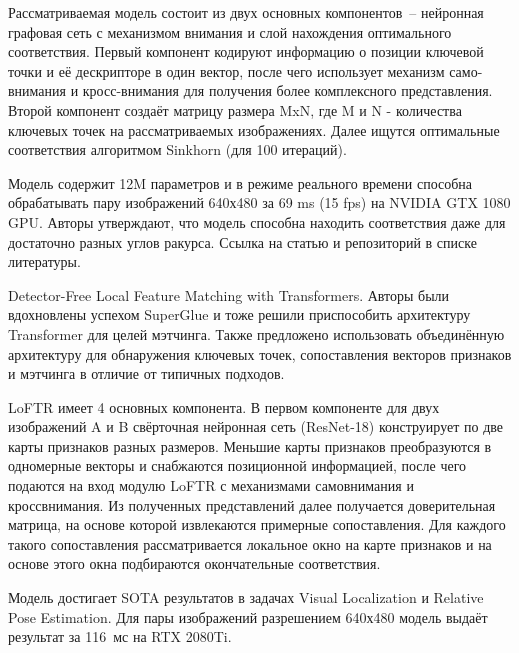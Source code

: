 \documentclass[a4paper]{article}
\begin{document}


Рассматриваемая модель состоит из двух основных компонентов~-- нейронная графовая сеть с механизмом внимания и слой нахождения оптимального соответствия. Первый компонент кодируют информацию о позиции ключевой точки и её дескрипторе в один вектор, после чего использует механизм само-внимания и кросс-внимания для получения более комплексного представления. Второй компонент создаёт матрицу размера MxN, где M и N - количества ключевых точек на рассматриваемых изображениях. Далее ищутся оптимальные соответствия алгоритмом Sinkhorn (для 100 итераций).


Модель содержит 12M параметров и в режиме реального времени способна обрабатывать пару изображений 640х480 за 69 ms (15 fps) на NVIDIA GTX 1080 GPU. Авторы утверждают, что модель способна находить соответствия даже для достаточно разных углов ракурса. Ссылка на статью и репозиторий в списке литературы.


 Detector-Free Local Feature Matching with Trans\-formers. Авторы были вдохновлены успехом SuperGlue и тоже решили приспособить архитектуру Transformer для целей мэтчинга. Также предложено использовать объединённую архитектуру для обнаружения ключевых точек, сопоставления векторов признаков и мэтчинга в отличие от типичных подходов. 




LoFTR имеет 4 основных компонента. В первом компоненте для двух изображений A и B свёрточная нейронная сеть (ResNet-18) конструирует по две карты признаков разных размеров. Меньшие карты признаков преобразуются в одномерные векторы и снабжаются позиционной информацией, после чего подаются на вход модулю  LoFTR с механизмами самовнимания и кроссвнимания. Из полученных представлений далее получается доверительная матрица, на основе которой извлекаются примерные сопоставления. Для каждого такого сопоставления рассматривается локальное окно на карте признаков и на основе этого окна подбираются окончательные соответствия.


Модель достигает SOTA результатов в задачах Visual Localization и Relative Pose Estimation. Для пары изображений разрешением 640х480 модель выдаёт результат за 116~мс на RTX 2080Ti.
\end{document}
